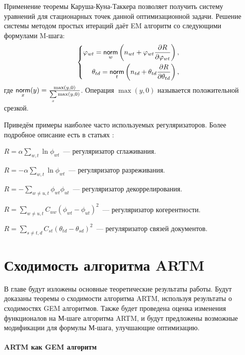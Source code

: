 \documentclass[12pt, twoside]{article}
\begin{document}
Применение теоремы Каруша-Куна-Таккера позволяет получить систему уравнений для стационарных точек данной оптимизационной задачи. Решение системы методом простых итераций даёт EM алгоритм со следующими формулами M-шага:
\[
\left\{
	\begin{aligned}
\varphi_{wt} = \mathop{\mathsf{norm}}\limits_w  \left(n_{wt} + \varphi_{wt}\frac{\partial R}{\partial\varphi_{wt}}\right),\\
\theta_{td} = \mathop{\mathsf{norm}}\limits_t  \left(n_{td} + \theta_{td}\frac{\partial R}{\partial\theta_{td}}\right),
	\end{aligned}
\right.
\]
где $\norm_x(y) = \frac{\max(y, 0)}{\sum\limits_x \max(y, 0)}$. Операция $\max(y, 0)$ называется положительной срезкой.

Приведём примеры наиболее часто используемых регуляризаторов. Более подробное описание есть в статьях \cite{vorontsov2014additive, vorontsov2014tutorial, vorontsov2015additive}:
\begin{enumerate*}
\item $R = \alpha \sum\limits_{w, t} \ln \phi_{wt}$~--- регуляризатор сглаживания.
\item $R = -\alpha \sum\limits_{w, t} \ln \phi_{wt}$~--- регуляризатор разреживания.
\item $R = -\sum\limits_{w \neq u, t} \phi_{wt} \phi_{ut}$~--- регуляризатор декоррелирования.
\item $R = \sum\limits_{w \neq u, t} C_{uw}\left( \phi_{wt}  - \phi_{ut} \right)^2$~--- регуляризатор когерентности.
\item $R = \sum\limits_{s \neq t, d} C_{st}\left( \theta_{td}  - \theta_{sd} \right)^2$~--- регуляризатор связей документов.
\end{enumerate*}

\section{Сходимость алгоритма ARTM}

В главе будут изложены основные теоретические результаты работы. Будут доказаны теоремы о сходимости алгоритма ARTM, используя результаты о сходимостях GEM алгоритмов. Также будет проведена оценка изменения функционалов на М-шаге алгоритма ARTM, и будут предложены возможные модификации для формулы М-шага, улучшающие оптимизацию. 
	
\paragraph{ARTM как GEM алгоритм}
\label{subsec:artmasgem}
\end{document}
